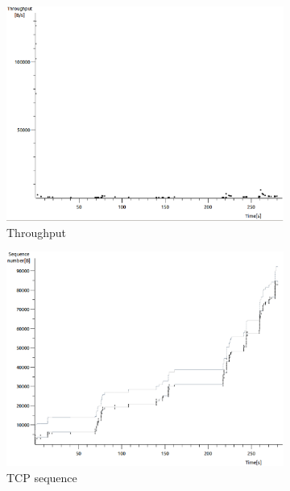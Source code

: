 \documentclass[conference,a4paper]{IEEEtran}
\begin{document}
\begin{figure}
 \centering
 \begin{subfigure}[b]{0.2\textwidth}
  \includegraphics[width=\textwidth]{s5-2_th}
  \caption{Throughput}
 \end{subfigure}
 \begin{subfigure}[b]{0.2\textwidth}
  \includegraphics[width=\textwidth]{s5-2_seq}
  \caption{TCP sequence}
 \end{subfigure}
 \begin{subfigure}[b]{0.2\textwidth}

\end{subfigure}
\end{figure}
\end{document}
